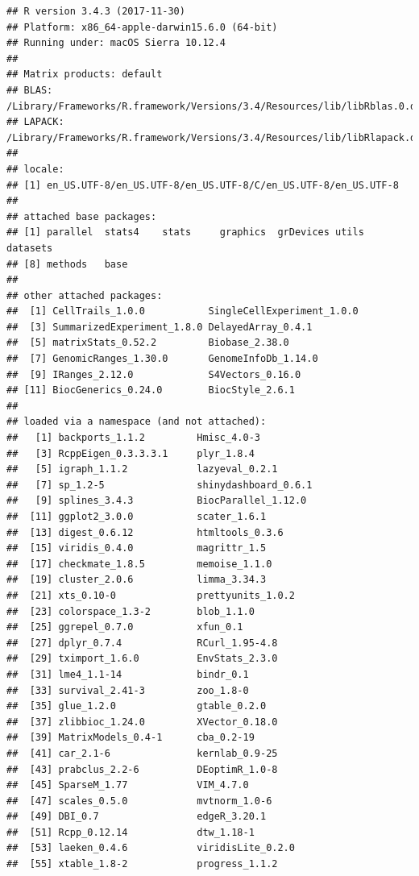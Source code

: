 \documentclass[]{book}
\theoremstyle{definition}
\theoremstyle{definition}
\theoremstyle{definition}
\theoremstyle{remark}
\begin{document}
\begin{verbatim}
## R version 3.4.3 (2017-11-30)
## Platform: x86_64-apple-darwin15.6.0 (64-bit)
## Running under: macOS Sierra 10.12.4
## 
## Matrix products: default
## BLAS: /Library/Frameworks/R.framework/Versions/3.4/Resources/lib/libRblas.0.dylib
## LAPACK: /Library/Frameworks/R.framework/Versions/3.4/Resources/lib/libRlapack.dylib
## 
## locale:
## [1] en_US.UTF-8/en_US.UTF-8/en_US.UTF-8/C/en_US.UTF-8/en_US.UTF-8
## 
## attached base packages:
## [1] parallel  stats4    stats     graphics  grDevices utils     datasets 
## [8] methods   base     
## 
## other attached packages:
##  [1] CellTrails_1.0.0           SingleCellExperiment_1.0.0
##  [3] SummarizedExperiment_1.8.0 DelayedArray_0.4.1        
##  [5] matrixStats_0.52.2         Biobase_2.38.0            
##  [7] GenomicRanges_1.30.0       GenomeInfoDb_1.14.0       
##  [9] IRanges_2.12.0             S4Vectors_0.16.0          
## [11] BiocGenerics_0.24.0        BiocStyle_2.6.1           
## 
## loaded via a namespace (and not attached):
##   [1] backports_1.1.2         Hmisc_4.0-3            
##   [3] RcppEigen_0.3.3.3.1     plyr_1.8.4             
##   [5] igraph_1.1.2            lazyeval_0.2.1         
##   [7] sp_1.2-5                shinydashboard_0.6.1   
##   [9] splines_3.4.3           BiocParallel_1.12.0    
##  [11] ggplot2_3.0.0           scater_1.6.1           
##  [13] digest_0.6.12           htmltools_0.3.6        
##  [15] viridis_0.4.0           magrittr_1.5           
##  [17] checkmate_1.8.5         memoise_1.1.0          
##  [19] cluster_2.0.6           limma_3.34.3           
##  [21] xts_0.10-0              prettyunits_1.0.2      
##  [23] colorspace_1.3-2        blob_1.1.0             
##  [25] ggrepel_0.7.0           xfun_0.1               
##  [27] dplyr_0.7.4             RCurl_1.95-4.8         
##  [29] tximport_1.6.0          EnvStats_2.3.0         
##  [31] lme4_1.1-14             bindr_0.1              
##  [33] survival_2.41-3         zoo_1.8-0              
##  [35] glue_1.2.0              gtable_0.2.0           
##  [37] zlibbioc_1.24.0         XVector_0.18.0         
##  [39] MatrixModels_0.4-1      cba_0.2-19             
##  [41] car_2.1-6               kernlab_0.9-25         
##  [43] prabclus_2.2-6          DEoptimR_1.0-8         
##  [45] SparseM_1.77            VIM_4.7.0              
##  [47] scales_0.5.0            mvtnorm_1.0-6          
##  [49] DBI_0.7                 edgeR_3.20.1           
##  [51] Rcpp_0.12.14            dtw_1.18-1             
##  [53] laeken_0.4.6            viridisLite_0.2.0      
##  [55] xtable_1.8-2            progress_1.1.2         

\end{verbatim}
\end{document}
